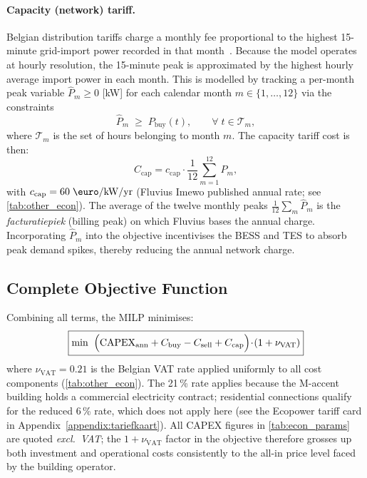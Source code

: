 \documentclass[11pt,a4paper]{report}
\begin{document}
\paragraph{Capacity (network) tariff.}
Belgian distribution tariffs charge a monthly fee proportional to the highest
15-minute grid-import power recorded in that month~\cite{Fluvius2023}.
Because the model operates at hourly resolution, the 15-minute peak is
approximated by the highest hourly average import power in each month.
This is modelled by tracking a per-month peak variable $\hat{P}_m \geq 0$ [kW]
for each calendar month $m \in \{1,\ldots,12\}$ via the constraints
\begin{equation}
    \hat{P}_m \;\geq\; P_\mathrm{buy}(t), \qquad
    \forall\; t \in \mathcal{T}_m,
    \label{eq:peak_track}
\end{equation}
where $\mathcal{T}_m$ is the set of hours belonging to month $m$.
The capacity tariff cost is then:
\begin{equation}
    C_\mathrm{cap} = c_\mathrm{cap} \cdot \frac{1}{12}\sum_{m=1}^{12} \hat{P}_m,
    \label{eq:opex_cap}
\end{equation}
with $c_\mathrm{cap} = 60\;\text{\euro/kW/yr}$ (Fluvius Imewo published annual rate;
see \autoref{tab:other_econ}).
The average of the twelve monthly peaks $\tfrac{1}{12}\sum_m \hat{P}_m$ is the
\emph{facturatiepiek} (billing peak) on which Fluvius bases the annual charge.
Incorporating $\hat{P}_m$ into the objective incentivises the BESS and TES to
absorb peak demand spikes, thereby reducing the annual network charge.

\subsection*{Complete Objective Function}

Combining all terms, the MILP minimises:
\begin{equation}
\boxed{
    \min\;\;
    \Bigl(
        \mathrm{CAPEX}_\mathrm{ann}
        + C_\mathrm{buy}
        - C_\mathrm{sell}
        + C_\mathrm{cap}
      \Bigr)\!\cdot\!(1 + \nu_\mathrm{VAT})
}
    \label{eq:objective}
\end{equation}
where $\nu_\mathrm{VAT} = 0.21$ is the Belgian VAT rate applied uniformly to all
cost components (\autoref{tab:other_econ}).
The 21\,\% rate applies because the M-accent building holds a commercial
electricity contract; residential connections qualify for the reduced 6\,\% rate,
which does not apply here (see the Ecopower tariff card in
Appendix~\ref{appendix:tariefkaart}).
All CAPEX figures in \autoref{tab:econ_params} are quoted \emph{excl.\ VAT};
the $1 + \nu_\mathrm{VAT}$ factor in the objective therefore grosses up both
investment and operational costs consistently to the all-in price level faced
by the building operator.
\end{document}
